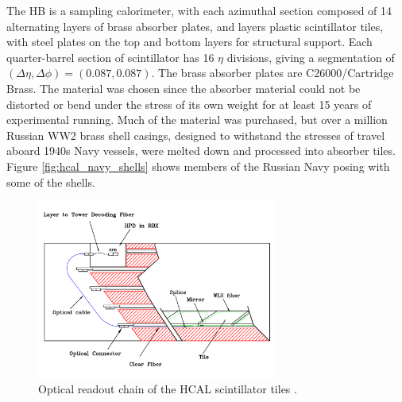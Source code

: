 \par The HB is a sampling calorimeter, with each azimuthal section
composed of 14 alternating layers of brass absorber plates, and layers
plastic scintillator tiles, with steel plates on the top and bottom
layers for structural support.  Each quarter-barrel section of
scintillator has 16 $\eta$ divisions, giving a segmentation of
$(\Delta\eta, \Delta\phi) = (0.087, 0.087)$.  The brass absorber
plates are C26000/Cartridge Brass.  The material was chosen since the
absorber material could not be distorted or bend under the stress of
its own weight for at least 15 years of experimental running.  Much of
the material was purchased, but over a million Russian WW2 brass shell
casings, designed to withstand the stresses of travel aboard 1940s
Navy vessels, were melted down and processed into absorber tiles.
Figure \ref{fig:hcal_navy_shells} shows members of the Russian Navy
posing with some of the shells. 

\begin{figure}[h]
   \centering
  \includegraphics[width=0.7\textwidth]{Figures/CMS_Diagrams/HCAL__OpticalReadout.pdf}
  \caption{Optical readout chain of the HCAL scintillator tiles
    \cite{CMS:CMS_Machine_Chatrchyan:2008aa}. } \label{fig:hcal_optical_readout}
\end{figure}

